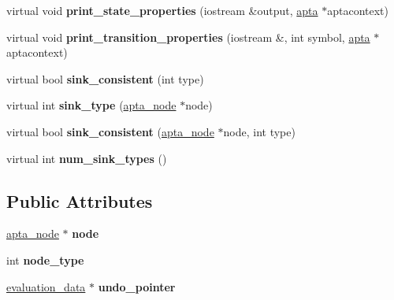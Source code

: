 \begin{DoxyCompactItemize}
virtual void {\bfseries print\+\_\+state\+\_\+properties} (iostream \&output, \hyperlink{classapta}{apta} $\ast$aptacontext)
\item 
\mbox{\label{classevaluation__data_af8178bdcaad4fad35bf5a003ad352424}} 
virtual void {\bfseries print\+\_\+transition\+\_\+properties} (iostream \&, int symbol, \hyperlink{classapta}{apta} $\ast$aptacontext)
\item 
\mbox{\label{classevaluation__data_ad3045eb73b3d82d657e808aa33848722}} 
virtual bool {\bfseries sink\+\_\+consistent} (int type)
\item 
\mbox{\label{classevaluation__data_a185bc8febf0cf0a8bd0a967e911c523c}} 
virtual int {\bfseries sink\+\_\+type} (\hyperlink{classapta__node}{apta\+\_\+node} $\ast$node)
\item 
\mbox{\label{classevaluation__data_abb8607435f006cb15269f252cd18b9da}} 
virtual bool {\bfseries sink\+\_\+consistent} (\hyperlink{classapta__node}{apta\+\_\+node} $\ast$node, int type)
\item 
\mbox{\label{classevaluation__data_ac863fd6a529ba41a87bdeac91cb981fb}} 
virtual int {\bfseries num\+\_\+sink\+\_\+types} ()
\end{DoxyCompactItemize}
\subsection*{Public Attributes}
\begin{DoxyCompactItemize}
\item 
\mbox{\label{classevaluation__data_ac0bbf719fd344e835e98ba25e5b29e1a}} 
\hyperlink{classapta__node}{apta\+\_\+node} $\ast$ {\bfseries node}
\item 
\mbox{\label{classevaluation__data_aa0838506c61ba0400cde7cb71bbcf449}} 
int {\bfseries node\+\_\+type}
\item 
\mbox{\label{classevaluation__data_a7c72d32aa4dbab4b03838bff5daa7b01}} 
\hyperlink{classevaluation__data}{evaluation\+\_\+data} $\ast$ {\bfseries undo\+\_\+pointer}
\end{DoxyCompactItemize}
